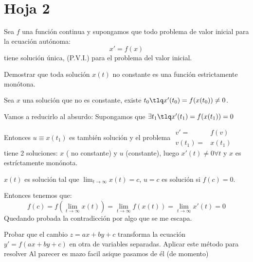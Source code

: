 \documentclass[nochap]{apuntes}
\begin{document}
\section{Hoja 2}
\begin{problem}[2]

Sea $f$ una función continua y supongamos que todo problema de valor inicial para la ecuación autónoma: \[x'=f(x)\]
tiene solución única, (P.V.I.) para el problema del valor inicial.

\ppart Demostrar que toda solución $x(t)$ no constante es una función estrictamente monótona.


\solution

\spart Sea $x$ una solución que no es constante, existe $t_0 \tlq x'(t_0) = f(x(t_0)) \neq 0$.

Vamos a reducirlo al absurdo: Supongamos que $\exists t_1 \tlq x'(t_1) = f(x(t_1)) = 0$ 

Entonces $u\equiv x(t_1) $ es también solución y el problema $\displaystyle \begin{array}{cc} v'=&f(v)\\v(t_1)=&x(t_1)\end{array}$ tiene 2 soluciones: $x$ ( no constante) y $u$ (constante), luego $x'(t)\neq 0 \forall t$ y $x$ es estríctamente monónota.

$x(t)$ es solución tal que $\lim_{t\to\infty} x(t) = c$, $u=c$ es solución si $f(c)=0$.

Entonces tenemos que:
\[f(c) = f(\lim_{t\to\infty} x(t)) = \lim_{t\to\infty} f(x(t)) = \lim_{t\to\infty}x'(t)=0\]
Quedando probada la contradicción por algo que se me escapa.
\end{problem}

\begin{problem}[3]


Probar que el cambio $z = ax + by + c$ transforma la ecuación $y'= f(ax + by + c)$
en otra de variables separadas. Aplicar este método para resolver
\solution
Al parecer es mazo facil asique pasamos de él (de momento)
\end{problem}
\end{document}
